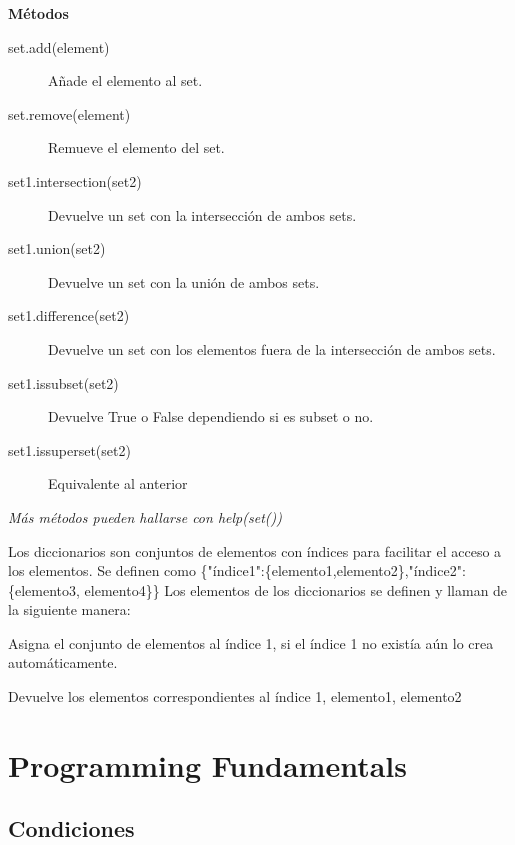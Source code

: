 \documentclass[10pt,a4paper]{article}
\begin{document}
\begin{description}[
align=right,
labelindent = 1cm,
labelsep=0.5cm,
itemindent=0cm]
        \textbf{Métodos}
        \begin{description}
            \item [set.add(element)] Añade el elemento al set.
            \item [set.remove(element)] Remueve el elemento del set.
            \item [set1.intersection(set2)] Devuelve un set con la intersección de ambos sets.
            \item [set1.union(set2)] Devuelve un set con la unión de ambos sets.
            \item [set1.difference(set2)] Devuelve un set con los elementos fuera de la intersección de ambos sets.
            \item [set1.issubset(set2)] Devuelve True o False dependiendo si es subset o no.
            \item [set1.issuperset(set2)] Equivalente al anterior
        \end{description}
        \textit{Más métodos pueden hallarse con \emph{help(set())}}
    
    \item [dictionary]
        Los diccionarios son conjuntos de elementos con índices para facilitar el acceso a los elementos. Se definen como \{"índice1":\{elemento1,elemento2\},"índice2":\{elemento3, elemento4\}\}
     Los elementos de los diccionarios se definen y llaman de la siguiente manera:
            
        \begin{description}[leftmargin=!,labelwidth=2.5cm,itemindent=0cm]
            \item [{$>>$ dic['índice1'] = \{elemento1,elemento2\}}] Asigna el conjunto de elementos al índice 1, si el índice 1 no existía aún lo crea automáticamente.
            \item [{$>>$ dic['índice1']}]   Devuelve los elementos correspondientes al índice 1, {elemento1, elemento2} 
        \end{description}

\end{description}

\section{Programming Fundamentals}

\subsection{Condiciones}
\end{document}
